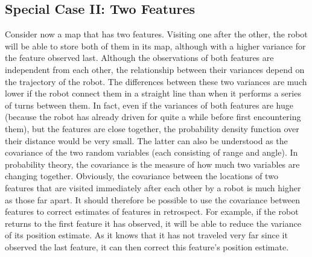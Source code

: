\documentclass[paper=6.14in:9.21in,pagesize=pdftex,11pt,twoside,openright]{scrbook}
\begin{document}
\subsection{Special Case II: Two Features}
Consider now a map that has two features. Visiting one after the other, the robot will be able to store both of them in its map, although with a higher variance for the feature observed last. Although the observations of both features are independent from each other, the relationship between their variances depend on the trajectory of the robot. The differences between these two variances are much lower if the robot connect them in a straight line than when it performs a series of turns between them. In fact, even if the variances of both features are huge (because the robot has already driven for quite a while before first encountering them), but the features are close together, the probability density function over their distance would be very small. The latter can also be understood as the covariance of the two random variables (each consisting of range and angle). In probability theory, the covariance is the measure of how much two variables are changing together. Obviously, the covariance between the locations of two features that are visited immediately after each other by a robot is much higher as those far apart. It should therefore be possible to use the covariance between features to correct estimates of features in retrospect. For example, if the robot returns to the first feature it has observed, it will be able to reduce the variance of its position estimate. As it knows that it has not traveled very far since it observed the last feature, it can then correct this feature's position estimate.
\end{document}
